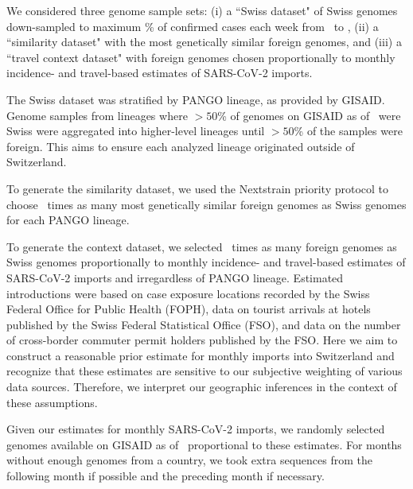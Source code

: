 \documentclass[9pt,twocolumn,twoside,lineno]{pnas-new}
\begin{document}
We considered three genome sample sets: (i) a ``Swiss dataset" of Swiss genomes down-sampled to maximum \maxsamplingpercent\% of confirmed cases each week from \mindate\ to \maxdate, (ii) a ``similarity dataset" with the most genetically similar foreign genomes, and (iii) a ``travel context dataset" with foreign genomes chosen proportionally to monthly incidence- and travel-based estimates of SARS-CoV-2 imports.  

The Swiss dataset was stratified by PANGO lineage, as provided by GISAID. Genome samples from lineages where $>50$\% of genomes on GISAID as of \GISAIDpulldate\ were Swiss were aggregated into higher-level lineages until $>50$\% of the samples were foreign. This aims to ensure each analyzed lineage originated outside of Switzerland.

To generate the similarity dataset, we used the Nextstrain priority protocol to choose \gensimscalefactor\ times as many most genetically similar foreign genomes as Swiss genomes for each PANGO lineage. 

To generate the context dataset, we selected \travelcontextscalefactor\ times as many foreign genomes as Swiss genomes proportionally to monthly incidence- and travel-based estimates of SARS-CoV-2 imports and irregardless of PANGO lineage. Estimated introductions were based on case exposure locations recorded by the Swiss Federal Office for Public Health (FOPH), data on tourist arrivals at hotels published by the Swiss Federal Statistical Office (FSO), and data on the number of cross-border commuter permit holders published by the FSO. Here we aim to construct a reasonable prior estimate for monthly imports into Switzerland and recognize that these estimates are sensitive to our subjective weighting of various data sources. Therefore, we interpret our geographic inferences in the context of these assumptions.

Given our estimates for monthly SARS-CoV-2 imports, we randomly selected genomes available on GISAID as of \GISAIDpulldate\ proportional to these estimates. For months without enough genomes from a country, we took extra sequences from the following month if possible and the preceding month if necessary. 

\end{document}
